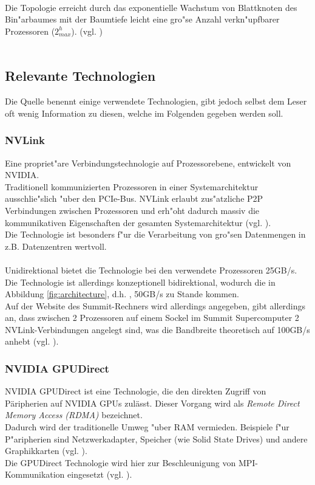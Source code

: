 \\
Die Topologie erreicht durch das exponentielle Wachstum von Blattknoten des Bin"arbaumes mit der Baumtiefe leicht eine gro"se Anzahl verkn"upfbarer Prozessoren ($2^h_{max}$). (vgl. \cite{fattree})\\
\\


\subsection{Relevante Technologien}
Die Quelle \cite{mainpaper} benennt einige verwendete Technologien, gibt jedoch selbst dem Leser oft wenig Information zu diesen, welche im Folgenden gegeben werden soll.

\subsubsection{ NVLink }
Eine propriet"are Verbindungstechnologie auf Prozessorebene, entwickelt von NVIDIA.\\
Traditionell kommunizierten Prozessoren in einer Systemarchitektur ausschlie"slich "uber den PCIe-Bus. NVLink erlaubt zus"atzliche P2P Verbindungen zwischen Prozessoren und erh"oht dadurch massiv die kommunikativen Eigenschaften der gesamten Systemarchitektur (vgl. \cite{nvlink}).\\
Die Technologie ist besonders f"ur die Verarbeitung von gro"sen Datenmengen in z.B. Datenzentren wertvoll.\\
\\
Unidirektional bietet die Technologie bei den verwendete Prozessoren 25GB/s. Die Technologie ist allerdings konzeptionell bidirektional, wodurch die in Abbildung \ref{fig:architecture}, d.h. \cite[Abb. 1]{mainpaper}, 50GB/s zu Stande kommen.\\
Auf der Website des Summit-Rechners wird allerdings angegeben, gibt allerdings an, dass zwischen 2 Prozessoren auf einem Sockel im Summit Supercomputer 2 NVLink-Verbindungen angelegt sind, was die Bandbreite theoretisch auf 100GB/s anhebt (vgl. \cite[FAQ, What is NVLink?]{osummit}).

\subsubsection{ NVIDIA GPUDirect }
NVIDIA GPUDirect ist eine Technologie, die den direkten Zugriff von Päripherien auf NVIDIA GPUs zulässt. Dieser Vorgang wird als \textit{Remote Direct Memory Access (RDMA)} bezeichnet.\\
Dadurch wird der traditionelle Umweg "uber RAM vermieden. Beispiele f"ur P"aripherien sind Netzwerkadapter, Speicher (wie Solid State Drives) und andere Graphikkarten (vgl. \cite{gpud}).\\
Die GPUDirect Technologie wird hier zur Beschleunigung von MPI-Kommunikation eingesetzt (vgl. \cite[Kap. 1]{mainpaper}).

